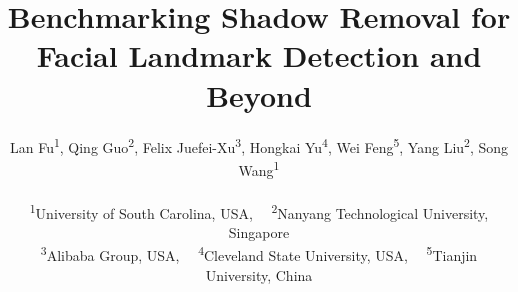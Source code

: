 \documentclass[10pt,twocolumn,letterpaper]{article}
\begin{document}
\title{Benchmarking Shadow Removal for Facial Landmark Detection and Beyond}

\author{Lan Fu\textsuperscript{1},
Qing Guo\textsuperscript{2},
Felix Juefei-Xu\textsuperscript{3},
Hongkai Yu\textsuperscript{4},
Wei Feng\textsuperscript{5},
Yang Liu\textsuperscript{2},
Song Wang\textsuperscript{1}\\~\\
\textsuperscript{1}University of South Carolina, USA,~~ 
\textsuperscript{2}Nanyang Technological University, Singapore \\
\textsuperscript{3}Alibaba Group, USA,~~ 
\textsuperscript{4}Cleveland State University, USA,~~ 
\textsuperscript{5}Tianjin University, China
}

\end{document}
